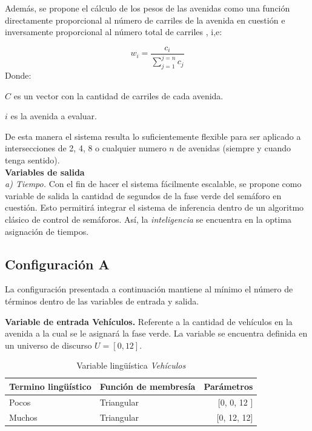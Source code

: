 Además, se propone el cálculo de los pesos de las avenidas como una función directamente proporcional al número de carriles de la avenida en cuestión e inversamente proporcional al número total de carriles , i,e:

\begin{displaymath}
w_i = \frac{ c_i }{\sum_{j=1}^{j=n} c_j}
\end{displaymath}
Donde:
{\setlength{\baselineskip}{0.7\baselineskip}\begin{description}
		\item $C$ es un vector con la cantidad de carriles de cada avenida.
		\item $i$ es la avenida a evaluar.
\end{description}}
De esta manera el sistema resulta lo suficientemente flexible para ser aplicado a intersecciones de 2, 4, 8 o cualquier numero $n$ de avenidas (siempre y cuando tenga sentido).\\

\textbf{Variables de salida}\\
\textit{a) Tiempo.} Con el fin de hacer el sistema fácilmente escalable, se propone como variable de salida la cantidad de segundos de la fase verde del semáforo en cuestión. Esto permitirá integrar el sistema de inferencia dentro de un algoritmo clásico de control de semáforos. Así, la \textit{inteligencia} se encuentra en la optima asignación de tiempos.

\newpage
\subsection{Configuración A}
La configuración presentada a continuación mantiene al mínimo el número de términos dentro de las variables de entrada y salida. 

\textbf{Variable de entrada Vehículos.} Referente a la cantidad de vehículos en la avenida a la cual se le asignará la fase verde. La variable se encuentra definida en un universo de discurso $U = [0,12]$.

\begin{table}[!h]
	\centering
	\begin{tabular}{llr} \toprule
		Termino lingüístico & Función de membresía & Parámetros \\ \midrule
		Pocos & Triangular & [0, 0, 12 ] \\
		Muchos & Triangular & [0, 12, 12] \\ \bottomrule
	\end{tabular}
	\caption[Variable lingüística \textit{Vehículos} (configuración \textit{A})]{Variable lingüística \textit{Vehículos}}
\end{table}


